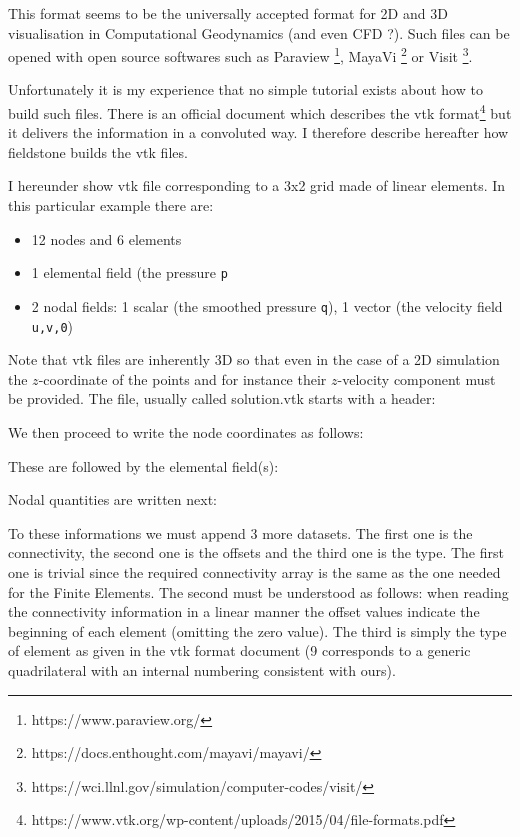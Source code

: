 
This format seems to be the universally accepted format for 2D and 3D visualisation in 
Computational Geodynamics (and even CFD ?). Such files can be opened with open source 
softwares such as 
Paraview \footnote{https://www.paraview.org/}, 
MayaVi \footnote{https://docs.enthought.com/mayavi/mayavi/}
or Visit \footnote{https://wci.llnl.gov/simulation/computer-codes/visit/}.

Unfortunately it is my experience that no simple tutorial exists about how to build 
such files. There is an official document which describes the vtk 
format\footnote{https://www.vtk.org/wp-content/uploads/2015/04/file-formats.pdf}
but it delivers the information in a convoluted way. I therefore describe hereafter 
how fieldstone builds the vtk files. 

I hereunder show vtk file corresponding to a 3x2 grid made of linear elements.
In this particular example there are:
\begin{itemize}
\item 12 nodes and 6 elements
\item 1 elemental field (the pressure {\tt p}
\item 2 nodal fields: 1 scalar (the smoothed pressure {\tt q}), 1 vector (the velocity field {\tt u,v,0})
\end{itemize}
Note that vtk files are inherently 3D so that even in the case of a 2D simulation the $z$-coordinate 
of the points and for instance their $z$-velocity component must be provided.
The file, usually called {\filenamefont solution.vtk} starts with a header:



We then proceed to write the node coordinates as follows:



These are followed by the elemental field(s):



Nodal quantities are written next:



To these informations we must append 3 more datasets. The first one is the connectivity, 
the second one is the offsets and the third one is the type. The first one is trivial
since the required connectivity array is the same as the one needed for the Finite Elements. 
The second must be understood as follows:
when reading the connectivity information in a linear manner the offset values 
indicate the beginning of each element (omitting the zero value). The third is simply the type of element 
as given in the vtk format document (9 corresponds to a generic quadrilateral with an 
internal numbering consistent with ours). 

